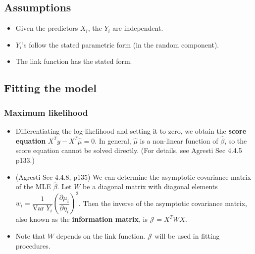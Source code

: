 \documentclass[twoside]{article}
\newcommand\calJ{\mathcal{J}}
\newcommand\var{\text{Var }}
\begin{document}
\subsection{Assumptions}
\begin{itemize}
\item Given the predictors $X_i$, the $Y_i$ are independent.
\item $Y_i$'s follow the stated parametric form (in the random component).
\item The link function has the stated form.
\end{itemize}

\subsection{Fitting the model}
\subsubsection*{Maximum likelihood}
\begin{itemize}
\item Differentiating the log-likelihood and setting it to zero, we obtain the \textbf{score equation} $X^T y - X^T \hat{\mu} = 0$. In general, $\hat{\mu}$ is a non-linear function of $\hat{\beta}$, so the score equation cannot be solved directly. (For details, see Agresti Sec 4.4.5 p133.)

\item (Agresti Sec 4.4.8, p135) We can determine the asymptotic covariance matrix of the MLE $\hat{\beta}$. Let $W$ be a diagonal matrix with diagonal elements $w_i = \dfrac{1}{\var Y_i}\left(\dfrac{\partial \mu_i}{\partial \eta_i} \right)^2$. Then the inverse of the asymptotic covariance matrix, also known as the \textbf{information matrix}, is $\calJ = X^T W X$.

\item Note that $W$ depends on the link function. $\calJ$ will be used in fitting procedures.
\end{itemize}
\end{document}
